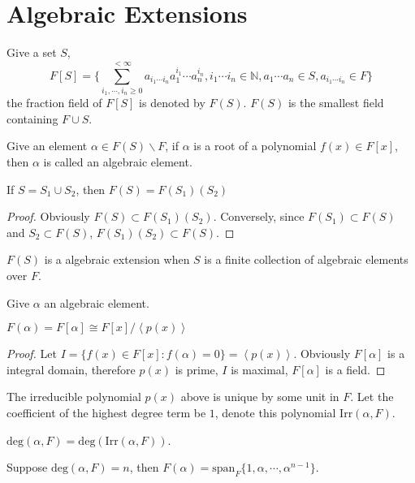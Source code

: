 \section{Algebraic Extensions}
\begin{definition}
    Give a set $S$, 
    $$F[S]=\{\sum_{i_1,\cdots,i_n\ge 0}^{<\infty}a_{i_1\cdots i_n} a_1^{i_1}\cdots a_n^{i_n}, i_1\cdots i_n\in\mathbb{N},a_1\cdots a_n\in S, a_{i_1\cdots i_n}\in F\}$$
    the fraction field of $F[S]$ is denoted by $F(S)$. $F(S)$ is the smallest field containing $F\cup S$. 
\end{definition}
\begin{remark}
    Give an element $\alpha\in F(S)\backslash F$, if $\alpha$ is a root of a polynomial $f(x)\in F[x]$, then $\alpha$ is called an algebraic element.
\end{remark}
\begin{proposition}
    If $S=S_1\cup S_2$, then $F(S)=F(S_1)(S_2)$
\end{proposition}
\begin{proof}
    Obviously $F(S)\subset F(S_1)(S_2)$. Conversely, since $F(S_1)\subset F(S)$ and $S_2\subset F(S)$, $F(S_1)(S_2)\subset F(S)$.
\end{proof}
\begin{definition}
    $F(S)$ is a algebraic extension when $S$ is a finite collection of algebraic elements over $F$.
\end{definition}
\begin{remark}
    Give $\alpha$ an algebraic element.
\end{remark}
\begin{proposition}
    $F(\alpha)=F[\alpha]\cong F[x]/\left<p(x)\right>$
\end{proposition}
\begin{proof}
    Let $I=\{f(x)\in F[x]:f(\alpha)=0\}=\left<p(x)\right>$. Obviously $F[\alpha]$ is a integral domain, therefore $p(x)$ is prime, $I$ is maximal, $F[\alpha]$ is a field.
\end{proof}
\begin{remark}
    The irreducible polynomial $p(x)$ above is unique by some unit in $F$. Let the coefficient of the highest degree term be $1$, denote this polynomial $\mathrm{Irr}(\alpha,F)$.
\end{remark}
\begin{definition}[Degree]
    $\mathrm{deg}(\alpha,F)=\mathrm{deg}(\mathrm{Irr}(\alpha,F))$.
\end{definition}
\begin{proposition}
    Suppose $\mathrm{deg}(\alpha,F)=n$, then $F(\alpha)=\mathrm{span}_F\{1,\alpha,\cdots,\alpha^{n-1}\}$.
\end{proposition}
